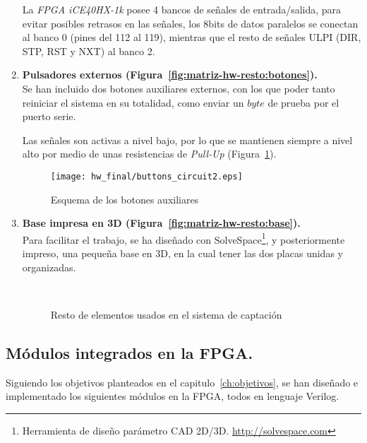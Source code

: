 \begin{enumerate}
    La \emph{FPGA iCE40HX-1k} posee 4 bancos de señales de entrada/salida, para evitar posibles retrasos en las señales\cite{fpga:routing}, los 8bits de datos paralelos se conectan al banco 0 (pines del 112 al 119), mientras que el resto de señales ULPI (DIR, STP, RST y NXT) al banco 2.
    
    \item \textbf{Pulsadores externos (Figura~\ref{fig:matriz-hw-resto:botones}).} \\
    Se han incluido dos botones auxiliares externos, con los que poder tanto reiniciar el sistema en su totalidad, como enviar un $byte$ de prueba por el puerto serie.
    
    Las señales son activas a nivel bajo, por lo que se mantienen siempre a nivel alto por medio de unas resistencias de \emph{Pull-Up} (Figura~\ref{fig:buttons_circuit}).
    \begin{figure}[h]
        \centering
        \texttt{[image: hw\_final/buttons\_circuit2.eps]}
        \caption{Esquema de los botones auxiliares}
        \label{fig:buttons_circuit}
    \end{figure}

    \item \textbf{Base impresa en 3D (Figura~\ref{fig:matriz-hw-resto:base}).} \\
    Para facilitar el trabajo, se ha diseñado con SolveSpace\footnote{Herramienta de diseño parámetro CAD 2D/3D. \url{http://solvespace.com}}, y posteriormente impreso, una pequeña base en 3D, en la cual tener las dos placas unidas y organizadas.

    \begin{figure}[!htb]
        \centering
         \\
        \caption{Resto de elementos usados en el sistema de captación} 
        \label{fig:matriz-hw-resto}
    \end{figure}
\end{enumerate}

\subsection{Módulos integrados en la FPGA.}
Siguiendo los objetivos planteados en el capitulo~\ref{ch:objetivos}, se han diseñado e implementado los siguientes módulos en la FPGA, todos en lenguaje Verilog.

